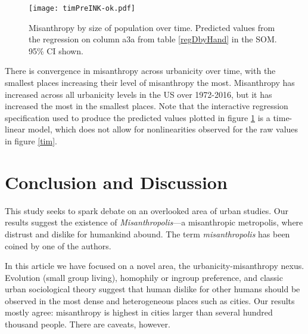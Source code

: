 \documentclass[11pt, letterpaper]{article}
\begin{document}
\begin{spacing}{1.4}
\begin{figure}[H]
  \texttt{[image: timPreINK-ok.pdf]}\centering
\caption{Misanthropy by size of population over time. Predicted values from the regression on column a3a from table \ref{regDbyHand} in the SOM. 95\% CI shown.}\label{timPre}%
\end{figure}

There is convergence in misanthropy across urbanicity over time, with the
smallest places increasing their level of misanthropy the most. Misanthropy has
increased across all urbanicity levels in the US over 1972-2016, but it has
increased the most in the smallest places. Note that the interactive regression
specification used to produce the predicted values plotted in figure
\ref{timPre} is a time-linear model, which does not allow for nonlinearities observed for the raw values in figure \ref{tim}.




\section*{Conclusion and Discussion}

This study seeks to spark debate on an overlooked area of urban studies. 
 Our results suggest the existence of
\emph{Misanthropolis}---a misanthropic metropolis,  where distrust and dislike for humankind
abound. {The term \emph{misanthropolis} has been coined by one of the authors.}


In this article we have focused on a  novel area, the urbanicity-misanthropy
nexus. %
Evolution  (small group living),  homophily or ingroup preference, and classic urban sociological theory suggest that human dislike for other humans should be observed in the most dense and heterogeneous places such as cities. Our results mostly agree: misanthropy is highest in cities larger than several hundred thousand people. There are caveats, however. 


\end{spacing}
\end{document}

